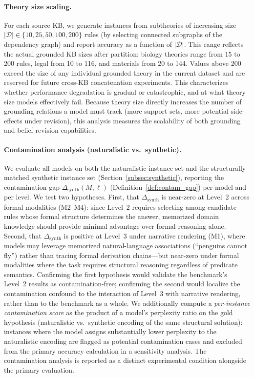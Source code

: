 \documentclass{article}
\theoremstyle{definition}
\newcommand{\D}{\mathcal{D}}
\begin{document}
\paragraph{Theory size scaling.} For each source KB, we generate instances from subtheories of increasing size $|\D| \in \{10, 25, 50, 100, 200\}$ rules (by selecting connected subgraphs of the dependency graph) and report accuracy as a function of $|\D|$. This range reflects the actual grounded KB sizes after partition: biology theories range from 15 to 200 rules, legal from 10 to 116, and materials from 20 to 144. Values above 200 exceed the size of any individual grounded theory in the current dataset and are reserved for future cross-KB concatenation experiments. This characterizes whether performance degradation is gradual or catastrophic, and at what theory size models effectively fail. Because theory size directly increases the number of grounding relations a model must track (more support sets, more potential side-effects under revision), this analysis measures the scalability of both grounding and belief revision capabilities.

\paragraph{Contamination analysis (naturalistic vs.\ synthetic).} We evaluate all models on both the naturalistic instance set and the structurally matched synthetic instance set (Section~\ref{subsec:synthetic}), reporting the contamination gap $\Delta_{\mathrm{synth}}(M, \ell)$ (Definition~\ref{def:contam_gap}) per model and per level. We test two hypotheses. First, that $\Delta_{\mathrm{synth}}$ is near-zero at Level~2 across formal modalities (M2--M4): since Level~2 requires selecting among candidate rules whose formal structure determines the answer, memorized domain knowledge should provide minimal advantage over formal reasoning alone. Second, that $\Delta_{\mathrm{synth}}$ is positive at Level~3 under narrative rendering (M1), where models may leverage memorized natural-language associations (``penguins cannot fly'') rather than tracing formal derivation chains---but near-zero under formal modalities where the task requires structural reasoning regardless of predicate semantics. Confirming the first hypothesis would validate the benchmark's Level~2 results as contamination-free; confirming the second would localize the contamination confound to the interaction of Level~3 with narrative rendering, rather than to the benchmark as a whole. We additionally compute a \emph{per-instance contamination score} as the product of a model's perplexity ratio on the gold hypothesis (naturalistic vs.\ synthetic encoding of the same structural solution): instances where the model assigns substantially lower perplexity to the naturalistic encoding are flagged as potential contamination cases and excluded from the primary accuracy calculation in a sensitivity analysis. The contamination analysis is reported as a distinct experimental condition alongside the primary evaluation.
\end{document}
